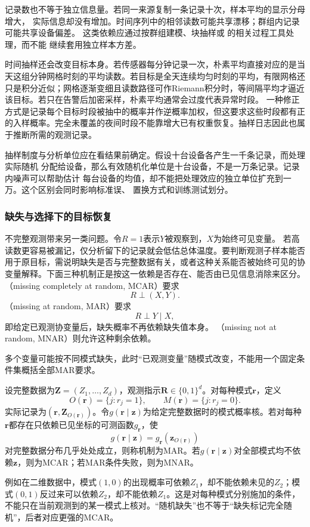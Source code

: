 记录数也不等于独立信息量。若同一来源复制一条记录十次，样本平均的显示分母增大，
实际信息却没有增加。时间序列中的相邻读数可能共享漂移；群组内记录可能共享设备偏差。
这类依赖应通过按群组建模、块抽样或
的相关过程工具处理，而不能
继续套用独立样本方差。

时间抽样还会改变目标本身。若传感器每分钟记录一次，朴素平均直接对应的是当天这组分钟网格时刻的平均读数。若目标是全天连续均匀时刻的平均，有限网格还只是积分近似；网格逐渐变细且读数路径可作Riemann积分时，等间隔平均才逼近该目标。若只在告警后加密采样，朴素平均通常会过度代表异常时段。
一种修正方式是记录每个目标时段被抽中的概率并作逆概率加权，但这要求这些时段都有正的入样概率。完全未覆盖的夜间时段不能靠增大已有权重恢复。抽样日志因此也属于推断所需的观测记录。

抽样制度与分析单位应在看结果前确定。假设十台设备各产生一千条记录，而处理实际随机
分配给设备，那么有效随机化单位是十台设备，不是一万条记录。记录内噪声可以帮助估计
每台设备的均值，却不能把处理效应的独立单位扩充到一万。这个区别会同时影响标准误、
置换方式和训练测试划分。

\subsubsection{缺失与选择下的目标恢复}

不完整观测带来另一类问题。令\(R=1\)表示\(Y\)被观察到，\(X\)为始终可见变量。
若高读数更容易被漏记，仅分析留下的记录就会低估总体温度。要判断观测子样本能否用于原目标，需说明缺失是否与完整数据有关，或者这种关系能否被始终可见的协变量解释。下面三种机制正是按这一依赖是否存在、能否由已见信息消除来区分。
（missing completely at random, MCAR）要求
\[
  R\mathrel{\perp}(X,Y).
\]
（missing at random, MAR）要求
\[
  R\mathrel{\perp}Y\mid X,
\]
即给定已观测协变量后，缺失概率不再依赖缺失值本身。
（missing not at random, MNAR）则允许这种剩余依赖。

多个变量可能按不同模式缺失，此时“已观测变量”随模式改变，不能用一个固定条件集概括全部MAR要求。
\begin{definition}[观测模式与缺失机制]
  \label{def:statistics-missingness}
  设完整数据为\(\bm Z=(Z_1,\ldots,Z_d)\)，观测指示\(\bm R\in\{0,1\}^d\)。对每种模式\(\bm r\)，定义
  \[
    O(\bm r)=\{j:r_j=1\},\qquad M(\bm r)=\{j:r_j=0\}.
  \]
  实际记录为\((\bm r,\bm Z_{O(\bm r)})\)。令\(g(\bm r\mid\bm z)\)为给定完整数据时的模式概率核。若对每种\(\bm r\)都存在只依赖已见坐标的可测函数\(g_{\bm r}\)，使
  \[
    g(\bm r\mid\bm z)=g_{\bm r}(\bm z_{O(\bm r)})
  \]
  对完整数据分布几乎处处成立，则称机制为MAR。若\(g(\bm r\mid\bm z)\)对全部模式均不依赖\(\bm z\)，则为MCAR；若MAR条件失败，则为MNAR。
\end{definition}
例如在二维数据中，模式\((1,0)\)的出现概率可依赖\(Z_1\)，却不能依赖未见的\(Z_2\)；模式\((0,1)\)反过来可以依赖\(Z_2\)，却不能依赖\(Z_1\)。这是对每种模式分别施加的条件，不能只在当前观测到的某一模式上核对。“随机缺失”也不等于“缺失标记完全随机”，后者对应更强的MCAR。

